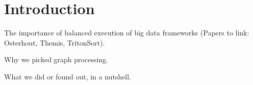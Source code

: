 \section{Introduction}
\label{sec:intro}
The importance of balanced execution of big data frameworks (Papers to link: 
Osterhout\cite{Ousterhout:2015:MSP:2789770.2789791}, Themis\cite{Rasmussen:2012:TIM:2391229.2391242}, 
TritonSort\cite{Rasmussen:2013:TBE:2427631.2427634}).

Why we picked graph processing.

What we did or found out, in a nutshell.

